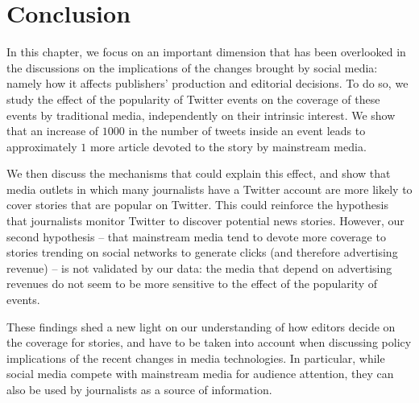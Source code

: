 \section{Conclusion\label{Sec:Conclusion}}

In this chapter, we focus on an important dimension that has been overlooked in the discussions on the implications of the changes brought by social media: namely how it affects publishers' production and editorial decisions. To do so, we study the effect of the popularity of Twitter events on the coverage of these events by traditional media, independently on their intrinsic interest. We show that an increase of $1000$ in the number of tweets inside an event leads to approximately $1$ more article devoted to the story by mainstream media. 

We then discuss the mechanisms that could explain this effect, and show that media outlets in which many journalists have a Twitter account are more likely to cover stories that are popular on Twitter. This could reinforce the hypothesis that journalists monitor Twitter to discover potential news stories. However, our second hypothesis -- that mainstream media tend to devote more coverage to stories trending on social networks to generate clicks (and therefore advertising revenue) -- is not validated by our data: the media that depend on advertising revenues do not seem to be more sensitive to the effect of the popularity of events.

These findings shed a new light on our understanding of how editors decide on the coverage for stories, and have to be taken into account when discussing policy implications of the recent changes in media technologies. In particular, while social media compete with mainstream media for audience attention, they can also be used by journalists as a source of information.
